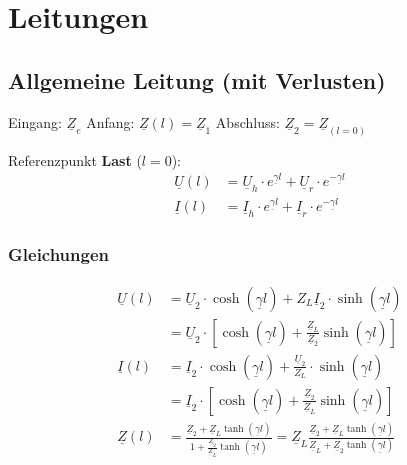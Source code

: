 \section{Leitungen}

\subsection{Allgemeine Leitung (mit Verlusten)}


Eingang: $ \underline{Z}_e $ \quad Anfang: $ \underline{Z}(l) = \underline{Z}_1 $ \quad
Abschluss: $ \underline{Z}_2 = \underline{Z}_{(l=0)}$

Referenzpunkt \textbf{Last} ($ l=0 $):
\begin{align*}
	\underline{U}(l) & = \underline{U}_h \cdot e^{\underline{\gamma}l} + \underline{U}_r \cdot e^{-\underline{\gamma} l}  \\
	\underline{I}(l) & = \underline{I}_h \cdot e^{\underline{\gamma} l} + \underline{I}_r \cdot e^{-\underline{\gamma} l}
\end{align*}

\subsubsection{Gleichungen}\label{sec:Leitungen_allg_Gleichungen}
\begin{align*}
	\underline{U}(l) & = \underline{U}_2 \cdot \cosh(\underline{\gamma}l) + Z_L \underline{I}_2 \cdot \sinh(\underline{\gamma}l)                                 \\
	                 & = \underline{U}_2 \cdot \left[ \cosh(\underline{\gamma} l) + \tfrac{\underline{Z}_L}{\underline{Z}_2} \sinh(\underline{\gamma} l) \right] \\
	\underline{I}(l) & = \underline{I}_2 \cdot \cosh(\underline{\gamma}l) + \frac{\underline{U}_2}{Z_L} \cdot \sinh(\underline{\gamma}l)                         \\
	                 & = \underline{I}_2 \cdot \left[ \cosh(\underline{\gamma} l) + \tfrac{\underline{Z}_2}{\underline{Z}_L} \sinh(\underline{\gamma} l) \right] \\
	\underline{Z}(l) & = \frac{\underline{Z}_2+ \underline{Z}_L\tanh(\underline{\gamma}
		l)}{1+\frac{\underline{Z}_2}{\underline{Z}_L}\tanh(\underline{\gamma} l)} =
	\underline{Z}_L \frac{\underline{Z}_2+ \underline{Z}_L\tanh(\underline{\gamma}
	l)}{{\underline{Z}_L}+{\underline{Z}_2}\tanh(\underline{\gamma} l)}
\end{align*}


